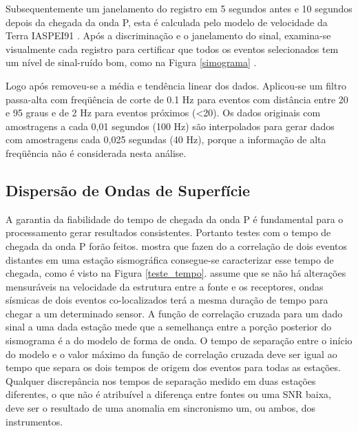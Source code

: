Subsequentemente um janelamento do registro em 5 segundos antes e 10 segundos depois da chegada da onda P, esta é calculada pelo modelo de velocidade da Terra  IASPEI91 \citep{kennet_iaspei_1991}. Após a discriminação e o janelamento do sinal, examina-se visualmente cada registro para certificar que todos os eventos selecionados tem um nível de sinal-ruído bom, como na Figura \ref{simograma} . 

Logo após removeu-se a média e tendência linear dos dados. Aplicou-se um filtro passa-alta com freqüência de corte de 0.1 Hz para eventos com distância entre 20 e 95 graus e de 2 Hz para eventos próximos (<20). Os dados originais com amostragens a cada 0,01 segundos (100 Hz) são interpolados para gerar dados com amostragens cada 0,025 segundas (40 Hz), porque a informação de alta freqüência não é considerada nesta análise.

\subsection{Dispersão de Ondas de Superfície}

A garantia da fiabilidade do tempo de chegada da onda P é fundamental para o processamento gerar resultados consistentes. Portanto testes com o tempo de chegada da onda P forão feitos. \cite{gibbons_identification_2006} mostra que fazen do a correlação de dois eventos distantes em uma estação sismográfica consegue-se caracterizar esse tempo de chegada, como é visto na Figura \ref{teste_tempo}. \cite{gibbons_identification_2006} assume que  se não há alterações mensuráveis na velocidade da estrutura entre a fonte e os receptores, ondas sísmicas de dois eventos co-localizados terá a mesma duração de tempo para chegar a um determinado sensor. A função de correlação cruzada para um dado sinal a uma dada estação mede que a semelhança entre a porção posterior do sismograma é a do modelo de forma de onda. O tempo de separação entre o início do modelo e o valor máximo da função de correlação cruzada deve ser igual ao tempo que separa os dois tempos de origem dos eventos para todas as estações. Qualquer discrepância nos tempos de separação medido em duas estações diferentes, o que não é atribuível a diferença entre fontes ou uma SNR baixa, deve ser o resultado de uma anomalia em sincronismo um, ou ambos, dos instrumentos.

